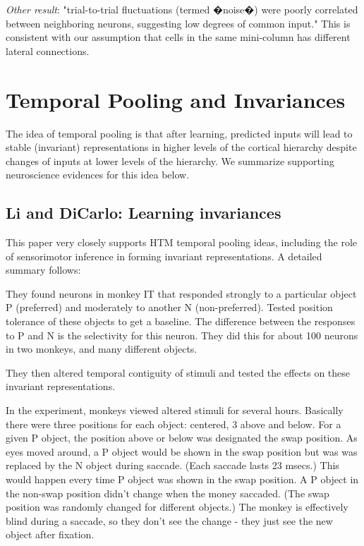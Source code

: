 \documentclass{article} %
\begin{document}
\emph{Other result}: "trial-to-trial fluctuations (termed �noise�) were poorly correlated between 
 neighboring neurons, suggesting low degrees of common input." This is consistent with 
 our assumption that cells in the same mini-column has different lateral connections.
 
\section{Temporal Pooling and Invariances}

The idea of temporal pooling is that after learning, predicted inputs will
lead to stable (invariant) representations in higher levels of the cortical
hierarchy despite changes of inputs at lower levels of the hierarchy. We
summarize supporting neuroscience evidences for this idea below.

\subsection{Li and DiCarlo: Learning invariances}

This paper \cite{Li2008} very closely supports HTM temporal pooling ideas,
including the role of sensorimotor inference in forming invariant
representations.  A detailed summary follows:

They found neurons in monkey IT that responded strongly to a particular object
P (preferred) and moderately to another N (non-preferred). Tested position
tolerance of these objects to get a baseline.  The difference between the
responses to P and N is the selectivity for this neuron.  They did this
for about 100 neurons in two monkeys, and many different objects.

They then altered temporal contiguity of stimuli and tested the effects on these
invariant representations.



In the experiment, monkeys viewed altered stimuli for several hours. Basically
there were three positions for each object: centered, 3 above and below. For a
given P object, the position above or below was designated the swap position.
As eyes moved around, a P object would be shown in the swap position but was was
replaced by the N object during saccade. (Each saccade lasts 23 msecs.) This
would happen every time P object was shown in the swap position.  A P object in
the non-swap position didn't change when the money saccaded. (The swap position
was randomly changed for different objects.)  The monkey is effectively blind
during a saccade, so they don't see the change - they just see the new object
after fixation.
\end{document}
